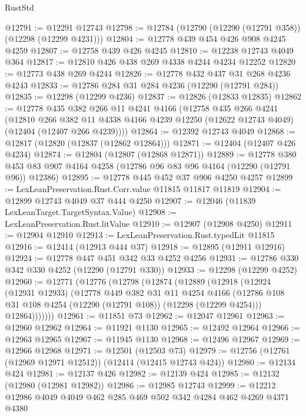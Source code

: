 \begin{lexlean}{RustStd}
\begin{coremodule}
@12791 := @12291 @12743
@12798 := @12784 (@12790 (@12290 (@12791 @358)) (@12298 (@12299 @4231)))
@12804 := @12778 @439 @454 @426 @908 @4245 @4259
@12807 := @12758 @439 @426 @4245
@12810 := @12238 @12743 @4049 @364
@12817 := @12810 @426 @438 @269 @4338 @4244 @4234 @12252
@12820 := @12773 @438 @269 @4244
@12826 := @12778 @432 @437 @31 @268 @4236 @4243
@12833 := @12786 @284 @31 @284 @4236 (@12290 (@12791 @284))
@12835 := @12298 (@12299 @4236)
@12837 := @12826 (@12833 @12835)
@12862 := @12778
    @435
    @382
    @266
    @11
    @4241
    @4166
    (@12758
      @435
      @266
      @4241
      (@12810
        @266
        @382
        @11
        @4338
        @4166
        @4239
        @12250
        (@12622 @12743 @4049)
        (@12404 (@12407 @266 @4239))))
@12864 := @12392 @12743 @4049
@12868 := @12817 (@12820 (@12837 (@12862 @12864)))
@12871 := @12404 (@12407 @426 @4234)
@12874 := @12804 (@12807 (@12868 @12871))
@12889 := @12778
    @380
    @453
    @83
    @907
    @4164
    @4258
    (@12786 @96 @83 @96 @4164 (@12290 (@12791 @96)) @12386)
@12895 := @12778 @445 @452 @37 @906 @4250 @4257
@12899 := LexLeanPreservation.Rust.Corr.value @11815 @11817 @11819
@12904 := @12899 @12743 @4049 @37 @444 @4250
@12907 := @12046 (@11839 LexLeanTarget.TargetSyntax.Value)
@12908 := LexLeanPreservation.Rust.litValue
@12910 := @12907 (@12908 @4250)
@12911 := @12904 @12910
@12913 := LexLeanPreservation.Rust.typedLit @11815
@12916 := @12414 (@12913 @444 @37)
@12918 := @12895 (@12911 @12916)
@12924 := @12778 @447 @451 @342 @33 @4252 @4256
@12931 := @12786 @330 @342 @330 @4252 (@12290 (@12791 @330))
@12933 := @12298 (@12299 @4252)
@12960 := @12771
    (@12776
      (@12798
        (@12874
          (@12889
            (@12918
              (@12924
                (@12931 @12933)
                (@12778
                  @449
                  @382
                  @31
                  @11
                  @4254
                  @4166
                  (@12786 @108 @31 @108 @4254 (@12290 (@12791 @108)) (@12298 (@12299 @4254)))
                  @12864)))))))
@12961 := @11851 @73
@12962 := @12047 @12961
@12963 := @12960 @12962
@12964 := @11921 @1130
@12965 := @12492 @12964
@12966 := @12963 @12965
@12967 := @11945 @1130
@12968 := @12496 @12967
@12969 := @12966 @12968
@12971 := @12501 (@12503 @73)
@12979 := @12756 (@12761 (@12969 @12971 @12512)) (@12414 (@12415 @12743 @424))
@12980 := @12134 @424
@12981 := @12137 @426
@12982 := @12139 @424
@12985 := @12132 (@12980 (@12981 @12982))
@12986 := @12985 @12743
@12999 := @12212 @12986 @4049 @4049 @462 @285 @469 @502 @342 @4284 @462 @4269 @4371 @4380

\end{coremodule}
\end{lexlean}
